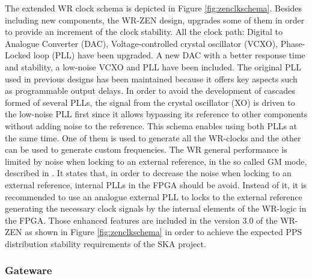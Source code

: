 The extended WR clock schema is depicted in Figure \ref{fig:zenclkschema}.
Besides including new components, the WR-ZEN design, upgrades some of them
in order to provide an increment of the clock stability. All the clock path: Digital to Analogue Converter (DAC), Voltage-controlled crystal oscillator (VCXO), Phase-Locked loop (PLL) have been upgraded. A new DAC \cite{web:ad5541a_datasheet} with a better response time and stability, a low-noise VCXO \cite{web:cvhd950_datasheet} and PLL \cite{web:lmk03806_datasheet}  have been included.
The original PLL \cite{web:ad9516_datasheet} used in previous designs has been maintained because it offers key aspects such as programmable output delays. In order to avoid the development of cascades formed of several PLLs, the signal from the crystal oscillator (XO) is driven to the low-noise PLL first since it allows bypassing its reference to other components without adding noise to the reference. This schema enables using both PLLs at the same time. One of them is used to generate all the WR-clocks and the other can be used to generate custom frequencies. The WR general performance is limited by noise when locking to an external reference, in the so called GM mode, described in \cite{Rizzi2016}. It states that, in order to decrease the noise when locking to an external reference, internal PLLs in the FPGA should be avoid. Instead of it, it is recommended to use an analogue external PLL to locks to the external reference generating the necessary clock signals by the internal elements of the WR-logic in the FPGA. Those enhanced features are included in the version 3.0 of the WR-ZEN as shown in Figure \ref{fig:zenclkschema} in order to achieve the expected PPS distribution stability requirements of the SKA project.


\subsubsection{Gateware} \label{subsec:gateware}


